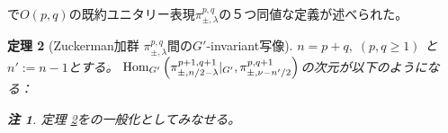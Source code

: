\documentclass[12pt]{article} %
\newtheorem{theorem}{定理}
\newcommand{\Hom}{\mbox{\normalfont Hom}}
\newtheorem{remark}[theorem]{注}
\theoremstyle{definition}
\theoremstyle{exampstyle} \newtheorem{examp}[theorem]{Theorem}
\begin{document}
\cite{KO2}で$O(p,q)$の既約ユニタリー表現$\pi_{\pm,\lambda}^{p,q}$の５つ同値な定義が述べられた。
\begin{theorem}[Zuckerman加群 $\pi_{\pm,\lambda}^{p,q}$間の$G'$-invariant写像]\label{thm:Aq}
	$n=p+q,\;(p,q\ge1)$ と $n':=n-1$とする。
	$\Hom_{G'}\left(\pi_{\pm,{n}/{2}-\lambda}^{p+1,q+1}\kern-0.3em\mid_{G'} ,\pi_{\pm,\nu-{n'}/{2}}^{p,q+1} \right)$の次元が以下のようになる：
	\newline
{}\\\vspace{\baselineskip}
\begin{remark}
定理 \ref{thm:Aq}を\cite[Thms. 12.1 and 1.3]{kobayashi2015symmetry}の一般化としてみなせる。
\end{remark}
\end{theorem}
\nocite{kobayashi2015program}
\small


\end{document}
